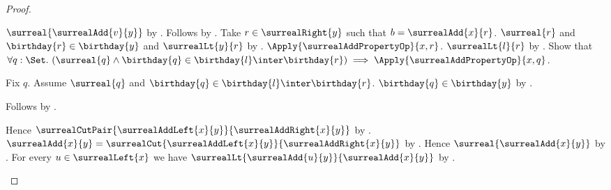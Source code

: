 \begin{proof}
\begin{subproof}
\begin{subproof}
\begin{byCase}
\begin{byCase}
                                $\surreal{\surrealAdd{v}{y}}$
                                by .
                            Follows by .
                            Take $r\in\surrealRight{y}$ such that
                                $b=\surrealAdd{x}{r}$.
                            $\surreal{r}$ and
                                $\birthday{r}\in\birthday{y}$ and
                                $\surrealLt{y}{r}$
                                by .
                            $\Apply{\surrealAddPropertyOp}{x,r}$.
                            $\surrealLt{l}{r}$
                                by .
                            Show that $\forall q:\Set.\ (\surreal{q}\land
                                \birthday{q}\in
                                    \birthday{l}\inter\birthday{r})
                                \implies
                                \Apply{\surrealAddPropertyOp}{x,q}$.
                            \begin{subproof}
                                Fix $q$.
                                Assume $\surreal{q}$ and
                                    $\birthday{q}\in
                                        \birthday{l}\inter\birthday{r}$.
                                $\birthday{q}\in\birthday{y}$
                                    by .
                            \end{subproof}
                            Follows by
                                .
                    \end{byCase}
            \end{byCase}
        \end{subproof}
        Hence $\surrealCutPair{\surrealAddLeft{x}{y}}
            {\surrealAddRight{x}{y}}$
            by .
        $\surrealAdd{x}{y}=
            \surrealCut{\surrealAddLeft{x}{y}}{\surrealAddRight{x}{y}}$
            by .
        Hence $\surreal{\surrealAdd{x}{y}}$
            by .
        For every $u\in\surrealLeft{x}$ we have
            $\surrealLt{\surrealAdd{u}{y}}{\surrealAdd{x}{y}}$
            by .

\end{subproof}
\end{proof}
